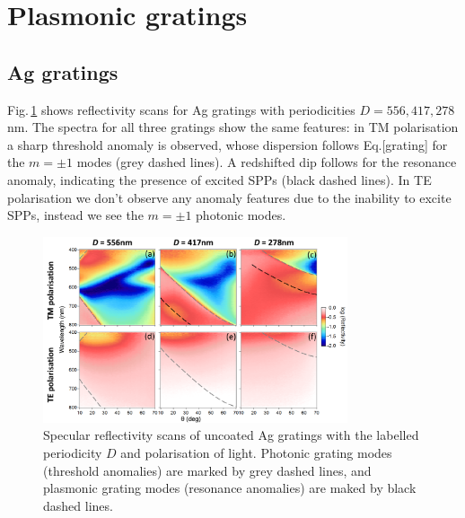 \section{Plasmonic gratings}

\subsection{Ag gratings}
Fig.\,\ref{7Fig7} shows reflectivity scans for Ag gratings with periodicities $D=556, 417, 278$\,nm. The spectra for all three gratings show the same features: in TM polarisation a sharp threshold anomaly is observed, whose dispersion follows Eq.[grating] for the $m=\pm1$ modes (grey dashed lines). A redshifted dip follows for the resonance anomaly, indicating the presence of excited SPPs (black dashed lines). In TE polarisation we don't observe any anomaly features due to the inability to excite SPPs, instead we see the $m=\pm1$ photonic modes.
\begin{figure}[ht] 
\centering    
\includegraphics[width=0.8\textwidth]{Fig7}
\caption{Specular reflectivity scans of uncoated Ag gratings with the labelled periodicity $D$ and polarisation of light. Photonic grating modes (threshold anomalies) are marked by grey dashed lines, and plasmonic grating modes (resonance anomalies) are maked by black dashed lines.}
\label{7Fig7}
\end{figure}

